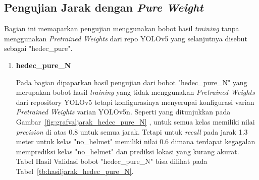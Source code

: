 \newpage
\subsection{Pengujian Jarak dengan \emph{Pure Weight}}
\label{subsec:ujijarak_pureweight}

\par Bagian ini memaparkan pengujian menggunakan bobot hasil \emph{training} tanpa menggunakan \emph{Pretrained Weights}
dari repo YOLOv5 yang selanjutnya disebut sebagai "hedec\_pure". 

\begin{enumerate}
  \item \textbf{hedec\_pure\_N}
  \par Pada bagian dipaparkan hasil pengujian dari bobot "hedec\_pure\_N" yang merupakan bobot hasil \emph{training}
  yang tidak menggunakan \emph{Pretrained Weights} dari repository YOLOv5 tetapi konfigurasinya menyerupai konfigurasi
  varian \emph{Pretrained Weights} varian YOLOv5n. Seperti yang ditunjukkan pada Gambar~\ref{fig:grafvaljarak_hedec_pure_N}
  , untuk semua kelas memiliki nilai \emph{precision} di atas 0.8 untuk semua jarak. Tetapi untuk \emph{recall} pada jarak 1.3 meter
  untuk kelas "no\_helmet" memiliki nilai 0.6 dimana terdapat kegagalan memprediksi kelas "no\_helmet" dan prediksi lokasi yang
  kurang akurat. Tabel Hasil Validasi bobot "hedec\_pure\_N" bisa dilihat pada Tabel~\ref{tb:hasiljarak_hedec_pure_N}.


\end{enumerate}

